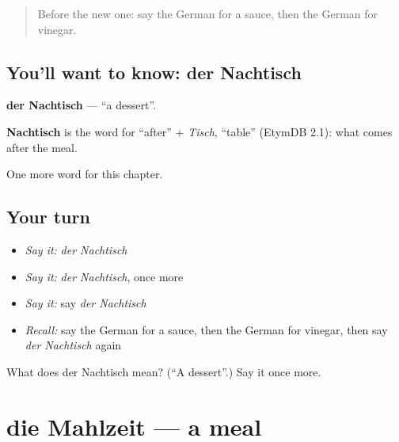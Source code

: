 \label{lesson:GE-C123-nachtisch}



\begin{quote}
Before the new one: say the German for a sauce, then the German for vinegar.
\end{quote}

\subsection*{You'll want to know: der Nachtisch}
\textbf{der Nachtisch} — \textquotedblleft{}a dessert\textquotedblright{}.

\begin{cousinweb}
\textbf{Nachtisch} is the word for \textquotedblleft{}after\textquotedblright{} + \emph{Tisch}, \textquotedblleft{}table\textquotedblright{} (EtymDB 2.1): what comes after the meal.
\end{cousinweb}

\begin{grammarlens}[title={What you've built}]
One more word for this chapter.
\end{grammarlens}

\subsection*{Your turn}
\begin{itemize}
\raggedright
  \item \emph{Say it:} \emph{der Nachtisch}
  \item \emph{Say it:} \emph{der Nachtisch}, once more
  \item \emph{Say it:} say \emph{der Nachtisch}
  \item \emph{Recall:} say the German for a sauce, then the German for vinegar, then say \emph{der Nachtisch} again
\end{itemize}

\begin{tcolorbox}[breakable,colback=teal!4,colframe=teal!35!black,title={Before you move on}]
What does der Nachtisch mean? (\textquotedblleft{}A dessert\textquotedblright{}.) Say it once more.
\end{tcolorbox}
\section[die Mahlzeit]{die Mahlzeit — a meal}

\label{lesson:GE-C123-mahlzeit}



